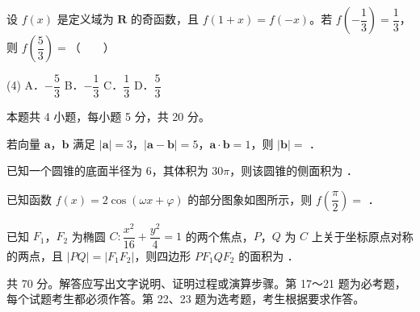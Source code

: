 \begin{question}
设 $f(x)$ 是定义域为 $\mathbf R$ 的奇函数，且 $f(1+x)=f(-x)$。若 $f\left(-\dfrac13\right)=\dfrac13$，则 $f\left(\dfrac53\right)=$\mbox{（　　）}

\begin{gkopts}(4)
\task A．$-\dfrac53$
\task B．$-\dfrac13$
\task C．$\dfrac13$
\task D．$\dfrac53$
\end{gkopts}

\par\medskip

\end{question}

\begin{gktip}
本题共 4 小题，每小题 5 分，共 20 分。
\end{gktip}

\begin{question}
若向量 $\boldsymbol a$，$\boldsymbol b$ 满足 $|\boldsymbol a|=3$，$|\boldsymbol a-\boldsymbol b|=5$，$\boldsymbol a\cdot\boldsymbol b=1$，则 $|\boldsymbol b|=$ \gkblank{}．

\end{question}
\begin{question}
已知一个圆锥的底面半径为 $6$，其体积为 $30\pi$，则该圆锥的侧面积为 \gkblank{}．

\Needspace{0.4\textheight}
\end{question}
\begin{question}
已知函数 $f(x)=2\cos(\omega x+\varphi)$ 的部分图象如图所示，则 $f\left(\dfrac\pi2\right)=$ \gkblank{}．
\nopagebreak[4]
\begin{center}\end{center}
\nopagebreak[4]
\end{question}
\begin{question}
已知 $F_1$，$F_2$ 为椭圆 $C:\dfrac{x^{2}}{16}+\dfrac{y^{2}}4=1$ 的两个焦点，$P$，$Q$ 为 $C$ 上关于坐标原点对称的两点，且 $|PQ|=|F_1F_2|$，则四边形 $PF_1QF_2$ 的面积为 \gkblank{}．

\par\medskip

\end{question}

\begin{gktip}
共 70 分。解答应写出文字说明、证明过程或演算步骤。第 17～21 题为必考题，每个试题考生都必须作答。第 22、23 题为选考题，考生根据要求作答。
\end{gktip}


